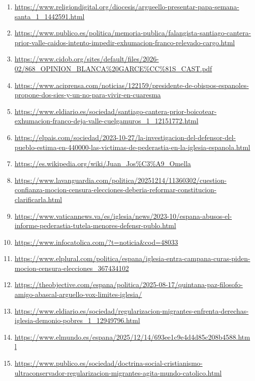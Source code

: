 \documentclass[10pt,a4paper]{article}
\begin{document}
\begin{enumerate}[leftmargin=*]
            \item \url{ https://www.religiondigital.org/diocesis/argueello-presentar-papa-semana-santa\_1\_1442591.html }
            \item \url{ https://www.publico.es/politica/memoria-publica/falangista-santiago-cantera-prior-valle-caidos-intento-impedir-exhumacion-franco-relevado-cargo.html }
            \item \url{ https://www.cidob.org/sites/default/files/2026-02/868\_OPINION\_BLANCA\%20GARCE\%CC\%81S\_CAST.pdf }
            \item \url{ https://www.aciprensa.com/noticias/122159/presidente-de-obispos-espanoles-propone-dos-sies-y-un-no-para-vivir-en-cuaresma }
            \item \url{ https://www.eldiario.es/sociedad/santiago-cantera-prior-boicotear-exhumacion-franco-deja-valle-cuelgamuros\_1\_12151772.html }
            \item \url{ https://elpais.com/sociedad/2023-10-27/la-investigacion-del-defensor-del-pueblo-estima-en-440000-las-victimas-de-pederastia-en-la-iglesia-espanola.html }
            \item \url{ https://es.wikipedia.org/wiki/Juan\_Jos\%C3\%A9\_Omella }
            \item \url{ https://www.lavanguardia.com/politica/20251214/11360302/cuestion-confianza-mocion-censura-elecciones-deberia-reformar-constitucion-clarificarla.html }
            \item \url{ https://www.vaticannews.va/es/iglesia/news/2023-10/espana-abusos-el-informe-pederastia-tutela-menores-defensr-publo.html }
            \item \url{ https://www.infocatolica.com/?t=noticia\&cod=48033 }
            \item \url{ https://www.elplural.com/politica/espana/iglesia-entra-campana-curas-piden-mocion-censura-elecciones\_367434102 }
            \item \url{ https://theobjective.com/espana/politica/2025-08-17/quintana-paz-filosofo-amigo-abascal-arguello-vox-limites-iglesia/ }
            \item \url{ https://www.eldiario.es/sociedad/regularizacion-migrantes-enfrenta-derechas-iglesia-demonio-pobres\_1\_12949796.html }
            \item \url{ https://www.elmundo.es/espana/2025/12/14/693ee1c9e4d4d85c208b4588.html }
            \item \url{ https://www.publico.es/sociedad/doctrina-social-cristianismo-ultraconservador-regularizacion-migrantes-agita-mundo-catolico.html }

\end{enumerate}
\end{document}
